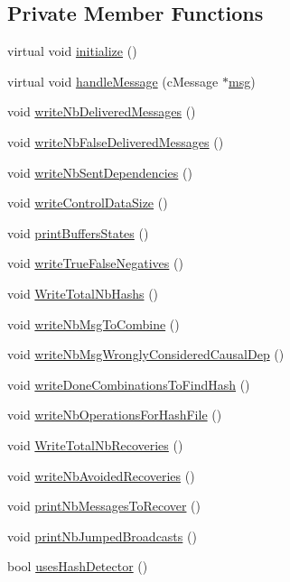 \subsection*{Private Member Functions}
\begin{DoxyCompactItemize}
\item 
virtual void \hyperlink{class_stats_a650afe7cc5721ec17cfdc94475365f89}{initialize} ()
\item 
virtual void \hyperlink{class_stats_adaf8eb884008cdcb1f8a08df41566d16}{handle\+Message} (c\+Message $\ast$\hyperlink{_controller_8h_afa0f3b802fbc219228f7bb97996fa558}{msg})
\item 
void \hyperlink{class_stats_afff16579776ca8a5e5dbc4483689c2e4}{write\+Nb\+Delivered\+Messages} ()
\item 
void \hyperlink{class_stats_a45fda4fde87dda93eaa44357d077d48c}{write\+Nb\+False\+Delivered\+Messages} ()
\item 
void \hyperlink{class_stats_a5e7dc3debec2bdc35b11e713283ab0b3}{write\+Nb\+Sent\+Dependencies} ()
\item 
void \hyperlink{class_stats_a49086baebc806841600c8545b5315149}{write\+Control\+Data\+Size} ()
\item 
void \hyperlink{class_stats_a890d6dea5350042fd71313826b103583}{print\+Buffers\+States} ()
\item 
void \hyperlink{class_stats_aa76e3bfd22087fad066c5a628a269d06}{write\+True\+False\+Negatives} ()
\item 
void \hyperlink{class_stats_a89cedfe36937b0f9a5f525a8858e54f2}{Write\+Total\+Nb\+Hashs} ()
\item 
void \hyperlink{class_stats_ae91ab66504445b9e703966b505a55eaa}{write\+Nb\+Msg\+To\+Combine} ()
\item 
void \hyperlink{class_stats_a04ae8a18f5e0713f9275a3cf7b20d181}{write\+Nb\+Msg\+Wrongly\+Considered\+Causal\+Dep} ()
\item 
void \hyperlink{class_stats_a73a83aa6b190ceb71e8ed2b131338d81}{write\+Done\+Combinations\+To\+Find\+Hash} ()
\item 
void \hyperlink{class_stats_af07c3564deda3a19d1efe92108a20c19}{write\+Nb\+Operations\+For\+Hash\+File} ()
\item 
void \hyperlink{class_stats_a75689d1481b0605ce74d775e36c21740}{Write\+Total\+Nb\+Recoveries} ()
\item 
void \hyperlink{class_stats_ac6a0fdf44cc2a3dc11ff22eb75faacf2}{write\+Nb\+Avoided\+Recoveries} ()
\item 
void \hyperlink{class_stats_ae2c59851f26885a62c2e65fda16d47ee}{print\+Nb\+Messages\+To\+Recover} ()
\item 
void \hyperlink{class_stats_aaba10264a569b9240a300ddc341e6a8c}{print\+Nb\+Jumped\+Broadcasts} ()
\item 
bool \hyperlink{class_stats_a509d8e8fba4312eeffe2c6cee722f30f}{uses\+Hash\+Detector} ()
\end{DoxyCompactItemize}
